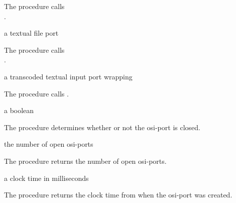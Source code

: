 The  procedure calls\\
.

\begin{procedure}
\end{procedure}
\returns{} a textual file port

The  procedure calls\\
.

\begin{procedure}
\end{procedure}
\returns{} a transcoded textual input port wrapping 

The  procedure calls
.

\begin{procedure}
\end{procedure}
\returns{} a boolean

The  procedure determines whether or not the
osi-port  is closed.

\begin{procedure}
\end{procedure}
\returns{} the number of open osi-ports

The  procedure returns the number of open
osi-ports.

\begin{procedure}
\end{procedure}
\returns{} a clock time in milliseconds

The  procedure returns the clock time from
 when the osi-port  was created.

